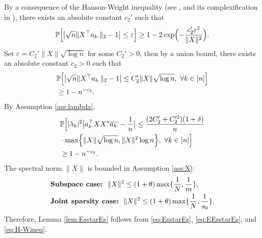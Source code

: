 \documentclass[11pt,journal]{IEEEtran}
\newcommand{\bbP}{\mathbb{P}}
\newcommand{\norm}[1]{\|{#1}\|}
\newcommand{\T}{\top}
\begin{document}



\begin{IEEEproof}
By a consequence of the Hanson-Wright inequality (see \cite[Theorem 2.1]{Rudelson2013}, and its complexification in \cite[Section 3.1]{Rudelson2013}), there exists an absolute constant $c_2'$ such that
\begin{align}
\bbP\Bigl[ \bigl|\sqrt{n}\norm{X^\T a_{k\cdot}}_2 - 1 \bigr| \leq \varepsilon \Bigr] \geq 1-2\exp\Bigl( -\frac{c_2'\varepsilon^2}{\norm{X}^2}\Bigr).
\label{eq:h-w}
\end{align}
Set $\varepsilon = C_2'\norm{X}\sqrt{\log n}$ for some $C_2'>0$, then by a union bound, there exists an absolute constant $c_2>0$ such that
\begin{align}
& \bbP\Bigl[ \bigl|\sqrt{n}\norm{X^\T a_{k\cdot}}_2 - 1 \bigr| \leq C_2'\norm{X}\sqrt{\log n},~ \forall k\in[n] \Bigr]  \nonumber\\
& \geq 1-n^{-c_2}. \label{eq:bdXa}
\end{align}
By Assumption \ref{ass:lambda},
\begin{align}
& \bbP\Bigl[ |\lambda_k|^2 \bigl | a_{k\cdot}^\T XX^* \overline{a_{k\cdot}} - \frac{1}{n} \bigr | \leq \frac{(2C_2'+C_2'^2)(1+\delta)}{n}  \nonumber\\
& \cdot \max\Bigl\{\norm{X}\sqrt{\log n}, \norm{X}^2\log n\Bigr\}, ~ \forall k\in[n] \Bigr]  \nonumber\\
& \geq 1-n^{-c_2}. \label{eq:H-Wineq}
\end{align}
The spectral norm $\norm{X}$ is bounded in Assumption \ref{ass:X}:
\begin{align*}
& \text{\textbf{Subspace case:}}~~\norm{X}^2 \leq (1+\theta)\max\{\frac{1}{N},\frac{1}{m}\},\\
& \text{\textbf{Joint sparsity case:}}~~\norm{X}^2 \leq (1+\theta)\max\{\frac{1}{N},\frac{1}{s_0}\}.
\end{align*}
Therefore, Lemma \ref{lem:EsstarEs} follows from \eqref{eq:EsstarEs}, \eqref{eq:EEsstarEs}, and \eqref{eq:H-Wineq}.
\end{IEEEproof}


\end{document}
